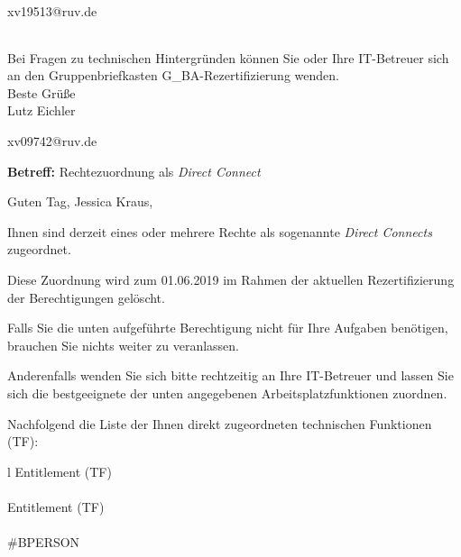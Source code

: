 \documentclass[a4paper,landscape,12pt]{letter}
\begin{document}
\begin{letter}{xv19513@ruv.de\hfill \break}
\begin{tiny}
\begin{longtable}{|p{35mm}|p{15mm}|p{25mm}|p{10mm}|p{40mm}|p{50mm}|p{50mm}|}
\hline
		\end{longtable}
		\end{tiny}
	
\begin{minipage}{\textwidth}
			Bei Fragen zu technischen Hintergründen können Sie 
			oder Ihre IT-Betreuer sich an den Gruppenbriefkasten 
			G\_BA-Rezertifizierung
			wenden.\\
			\linebreak
			Beste Grüße\\
			Lutz Eichler
	\end{minipage}
	\end{letter}
	
\begin{letter}{xv09742@ruv.de\hfill \break}
\begin{normalsize}
	\opening{\textbf{Betreff:} Rechtezuordnung als \emph{Direct Connect}}
	\begin{normalsize} \hfill
	\end{normalsize}

	\begin{normalsize}
		Guten Tag, 
	Jessica Kraus, \hfill \break
	\end{normalsize}
	\end{normalsize}
	
\begin{normalsize}
	Ihnen sind derzeit eines oder mehrere Rechte als sogenannte \emph{Direct Connects} zugeordnet.
	
	Diese Zuordnung wird zum 01.06.2019 im Rahmen der aktuellen Rezertifizierung der Berechtigungen gelöscht.
	
	Falls Sie die unten aufgeführte Berechtigung nicht für Ihre Aufgaben benötigen, 
	brauchen Sie nichts weiter zu veranlassen.
	
	Anderenfalls wenden Sie sich bitte rechtzeitig an Ihre IT-Betreuer 
	und lassen Sie sich die bestgeeignete der unten angegebenen Arbeitsplatzfunktionen zuordnen.
	\end{normalsize}
	
\begin{normalsize}
	Nachfolgend die Liste der Ihnen direkt zugeordneten technischen Funktionen (TF):

	\begin{longtable}{l}
		Entitlement (TF) \\ \hline
		\endfirsthead
		\\\hline
		Entitlement (TF) \\ \hline
		\endhead %
		\multicolumn{1}{r@{}}{Fortsetzung \ldots}\\
		\endfoot
		\hline
		\endlastfoot
	\#BPERSON\\
	\end{longtable}
	\end{normalsize}
	

\end{letter}
\end{document}
